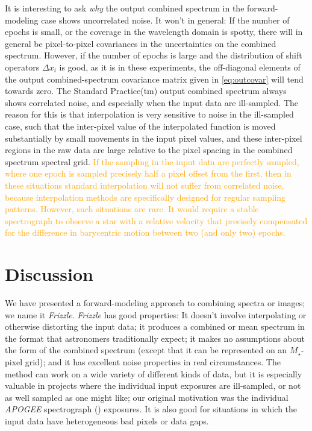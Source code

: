 \documentclass[modern, linenumbers]{aastex631}
\newcommand{\name}{\textsl{Frizzle}}
\newcommand{\modified}[1]{\textcolor{orange}{#1}}
\begin{document}
It is interesting to ask \emph{why} the output combined spectrum in the forward-modeling case shows uncorrelated noise.
It won't in general: If the number of epochs is small, or the coverage in the wavelength domain is spotty, there will in general be pixel-to-pixel covariances in the uncertainties on the combined spectrum.
However, if the number of epochs is large and the distribution of shift operators $\Delta x_i$ is good, as it is in these experiments, the off-diagonal elements of the output combined-spectrum covariance matrix given in \eqref{eq:outcovar} will tend towards zero.
The Standard Practice(tm) output combined spectrum always shows correlated noise, and especially when the input data are ill-sampled.
The reason for this is that interpolation is very sensitive to noise in the ill-sampled case, such that the inter-pixel value of the interpolated function is moved substantially by small movements in the input pixel values, and these inter-pixel regions in the raw data are large relative to the pixel spacing in the combined spectrum spectral grid. \modified{If the sampling in the input data are perfectly sampled, where one epoch is sampled precisely half a pixel offset from the first, then in these situations standard interpolation will not suffer from correlated noise, because interpolation methods are specifically designed for regular sampling patterns. However, such situations are rare. It would require a stable spectrograph to observe a star with a relative velocity that precisely compensated for the difference in barycentric motion between two (and only two) epochs.}



\section{Discussion}\label{sec:discussion}

We have presented a forward-modeling approach to combining spectra or images;
we name it \name.
\name{} has good properties:
It doesn't involve interpolating or otherwise distorting the input data;
it produces a combined or mean spectrum in the format that astronomers traditionally expect;
it makes no assumptions about the form of the combined spectrum (except that it can be represented on an $M_\star$-pixel grid);
and it has excellent noise properties in real circumstances.
The method can work on a wide variety of different kinds of data, but it is especially valuable in projects where the individual input exposures are ill-sampled, or not as well sampled as one might like; our original motivation was the individual \textsl{APOGEE} spectrograph (\citealt{apogeehardware}) exposures.
It is also good for situations in which the input data have heterogeneous bad pixels or data gaps.
\end{document}
